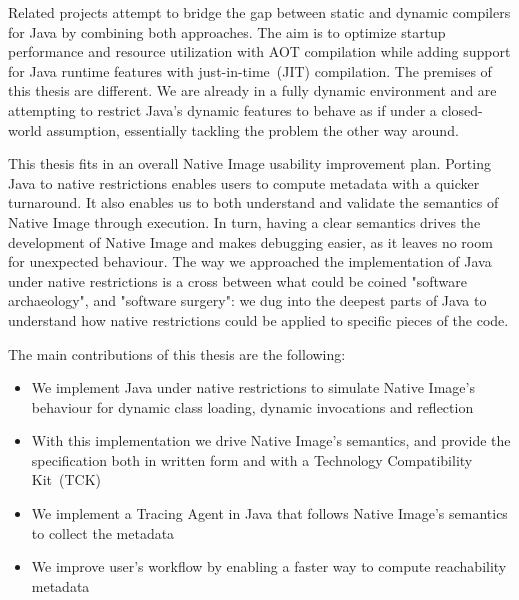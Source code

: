 Related projects attempt to bridge the gap between static and dynamic compilers for Java by combining both approaches. The aim is to optimize startup performance and resource utilization with AOT compilation while adding support for Java runtime features with just-in-time~(JIT) compilation. The premises of this thesis are different. We are already in a fully dynamic environment and are attempting to restrict Java's dynamic features to behave as if under a closed-world assumption, essentially tackling the problem the other way around. 

This thesis fits in an overall Native Image usability improvement plan. Porting Java to native restrictions enables users to compute metadata with a quicker turnaround. It also enables us to both understand and validate the semantics of Native Image through execution. In turn, having a clear semantics drives the development of Native Image and makes debugging easier, as it leaves no room for unexpected behaviour.
The way we approached the implementation of Java under native restrictions is a cross between what could be coined "software archaeology", and "software surgery": we dug into the deepest parts of Java to understand how native restrictions could be applied to specific pieces of the code.

The main contributions of this thesis are the following:
\begin{itemize}
  \item We implement Java under native restrictions to simulate Native Image's behaviour for dynamic class loading, dynamic invocations and reflection
  \item With this implementation we drive Native Image's semantics, and provide the specification both in written form and with a Technology Compatibility Kit~(TCK) 
  \item We implement a Tracing Agent in Java that follows Native Image's semantics to collect the metadata 
  \item We improve user's workflow by enabling a faster way to compute reachability metadata
\end{itemize}